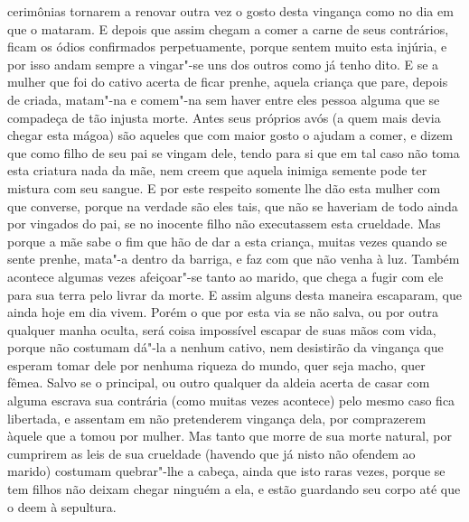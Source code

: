 cerimônias tornarem a renovar outra vez o gosto desta vingança como no
dia em que o mataram. E depois que assim chegam a comer a carne de seus
contrários, ficam os ódios confirmados perpetuamente, porque sentem
muito esta injúria, e por isso andam sempre a vingar"-se uns dos outros
como já tenho dito. E se a mulher que foi do cativo acerta de ficar
prenhe, aquela criança que pare, depois de criada, matam"-na e comem"-na		%
sem haver entre eles pessoa alguma que se compadeça de tão injusta
morte. Antes seus próprios avós (a quem mais devia chegar esta mágoa)
são aqueles que com maior gosto o ajudam a comer, e dizem que como
filho de seu pai se vingam dele, tendo para si que em tal caso não toma			%
esta criatura nada da mãe, nem creem que aquela inimiga semente pode ter
mistura com seu sangue. E por este respeito somente lhe dão esta
mulher com que converse, porque na verdade são eles tais, que não se
haveriam de todo ainda por vingados do pai, se no inocente filho não			%
executassem esta crueldade. Mas porque a mãe sabe o fim que hão de dar
a esta criança, muitas vezes quando se sente prenhe, mata"-a dentro da
barriga, e faz com que não venha à luz. Também acontece algumas vezes
afeiçoar"-se tanto ao marido, que chega a fugir com ele para sua terra
pelo livrar da morte. E assim alguns  desta maneira
escaparam, que ainda hoje em dia vivem. Porém o que por esta via se não
salva, ou por outra qualquer manha oculta, será coisa impossível
escapar de suas mãos com vida, porque não costumam dá"-la a nenhum
cativo, nem desistirão da vingança que esperam tomar dele por nenhuma
riqueza do mundo, quer seja macho, quer fêmea. Salvo se o principal, ou
outro qualquer da aldeia acerta de casar com alguma escrava sua contrária
(como muitas vezes acontece) pelo mesmo caso fica libertada, e assentam
em não pretenderem vingança dela, por comprazerem àquele que a tomou
por mulher. Mas tanto que morre de sua morte natural, por cumprirem as
leis de sua crueldade (havendo que já nisto não ofendem ao marido)
costumam quebrar"-lhe a cabeça, ainda que isto raras vezes, porque se
tem filhos não deixam chegar ninguém a ela, e estão guardando seu corpo
até que o deem à sepultura.

